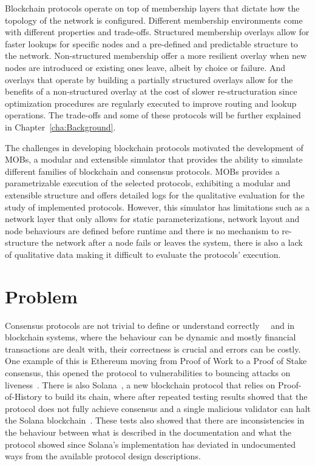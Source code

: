 Blockchain protocols operate on top of membership layers that dictate how the topology of the network is configured.
Different membership environments come with different properties and trade-offs. Structured membership overlays allow for faster lookups for
specific nodes and a pre-defined and predictable structure to the network. Non-structured membership offer a more resilient overlay when
new nodes are introduced or existing ones leave, albeit by choice or failure. And overlays that operate by building a partially structured
overlays allow for the benefits of a non-structured overlay at the cost of slower re-structuration since optimization
procedures are regularly executed to improve routing and lookup operations. The trade-offs and some of these protocols will be further
explained in Chapter~\ref{cha:Background}.

The challenges in developing blockchain protocols motivated the development of MOBs, a modular and extensible simulator that provides
the ability to simulate different families of blockchain and consensus protocols.
MOBs provides a parametrizable execution of the selected protocols, exhibiting a modular and extensible structure and offers detailed logs for the
qualitative evaluation for the study of implemented protocols. However, this simulator has limitations such as a network layer
that only allows for static parameterizations, network layout and node behaviours are defined before runtime and there is no mechanism to
re-structure the network after a node fails or leaves the system, there is also a lack of qualitative data making it difficult to
evaluate the protocols' execution.

\section{Problem}\label{sub:problem}
Consensus protocols are not trivial to define or understand correctly~\cite{paxos}~\cite{have_we_reached_consensus}
and in blockchain systems, where the behaviour can be dynamic and mostly 
financial transactions are dealt with, their correctness is crucial and errors can be costly. One example of this is Ethereum moving from 
Proof of Work to a Proof of Stake consensus, this opened the protocol to vulnerabilities to bouncing attacks on liveness~\cite{ethereum_analysis}.
There is also Solana~\cite{solana}, a new blockchain protocol that relies on Proof-of-History to build its chain,
where after repeated testing results showed that the protocol does not fully achieve consensus and
a single malicious validator can halt the Solana blockchain~\cite{solana_halting_problem}. These tests also showed that there are
inconsistencies in the behaviour between what is described in the documentation and what the protocol showed since Solana's implementation
has deviated in undocumented ways from the available protocol design descriptions.

